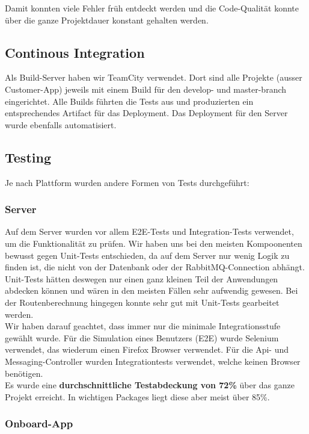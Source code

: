 Damit konnten viele Fehler früh entdeckt werden und die Code-Qualität konnte über die ganze Projektdauer konstant gehalten werden.

\subsection{Continous Integration}

Als Build-Server haben wir TeamCity verwendet. Dort sind alle Projekte (ausser Customer-App) jeweils mit einem Build für den develop- und master-branch eingerichtet. Alle Builds führten die Tests aus und produzierten ein entsprechendes Artifact für das Deployment. Das Deployment für den Server wurde ebenfalls automatisiert.

\subsection{Testing}

Je nach Plattform wurden andere Formen von Tests durchgeführt:

\subsubsection{Server}

Auf dem Server wurden vor allem \Gls{E2E-Test}s und \Gls{Integration-Test}s verwendet, um die Funktionalität zu prüfen. Wir haben uns bei den meisten Kompoonenten bewusst gegen \Gls{Unit-Tests} entschieden, da auf dem Server nur wenig Logik zu finden ist, die nicht von der Datenbank oder der RabbitMQ-Connection abhängt. Unit-Tests hätten deswegen nur einen ganz kleinen Teil der Anwendungen abdecken können und wären in den meisten Fällen sehr aufwendig gewesen. Bei der Routenberechnung hingegen konnte sehr gut mit Unit-Tests gearbeitet werden.\\

Wir haben darauf geachtet, dass immer nur die minimale Integrationsstufe gewählt wurde. Für die Simulation eines Benutzers (E2E) wurde Selenium verwendet, das wiederum einen Firefox Browser verwendet. Für die Api- und Messaging-Controller wurden Integrationtests verwendet, welche keinen Browser benötigen.\\

Es wurde eine \textbf{durchschnittliche Testabdeckung von 72\%} über das ganze Projekt erreicht. In wichtigen Packages liegt diese aber meist über 85\%.

\subsubsection{Onboard-App}

